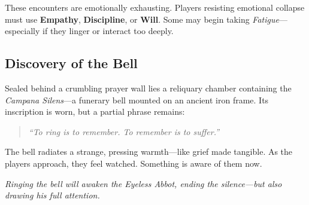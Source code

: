 \documentclass[nodeprecatedcode,bg=print]{dndbook/dndbook}
\begin{document}
These encounters are emotionally exhausting. Players resisting emotional collapse must use \textbf{Empathy}, \textbf{Discipline}, or \textbf{Will}. Some may begin taking \emph{Fatigue}—especially if they linger or interact too deeply.

\subsection{Discovery of the Bell}

Sealed behind a crumbling prayer wall lies a reliquary chamber containing the \emph{Campana Silens}—a funerary bell mounted on an ancient iron frame. Its inscription is worn, but a partial phrase remains:

\begin{quote}
\textit{“To ring is to remember. To remember is to suffer.”}
\end{quote}

The bell radiates a strange, pressing warmth—like grief made tangible. As the players approach, they feel watched. Something is aware of them now.

\emph{Ringing the bell will awaken the Eyeless Abbot, ending the silence—but also drawing his full attention.}
\end{document}
